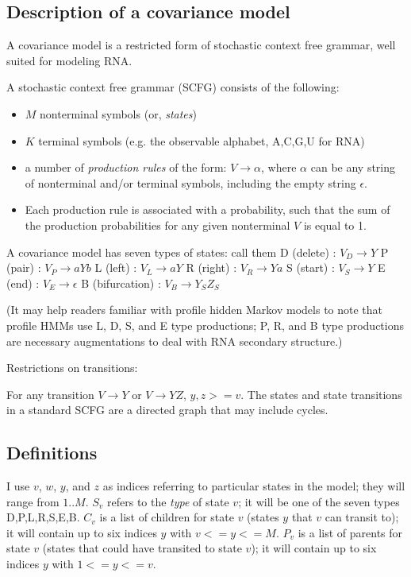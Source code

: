 \subsection{Description of a covariance model}

A covariance model is a restricted form of stochastic context free
grammar, well suited for modeling RNA.

A stochastic context free grammar (SCFG) consists of the following:

\begin{itemize}
\item $M$ nonterminal symbols (or, \emph{states})
\item $K$ terminal symbols (e.g. the observable alphabet, {A,C,G,U} for RNA)
\item a number of \emph{production rules} of the form:
      $V \rightarrow \alpha$,
      where $\alpha$ can be any string of nonterminal and/or terminal
      symbols, including the empty string
      $\epsilon$.
\item Each production rule is associated with a probability, such that
      the sum of the production probabilities for any given
      nonterminal $V$ is equal to 1.
\end{itemize} 

A covariance model has seven types of states: call them 
D (delete)          : $V_D \rightarrow Y$
P (pair)            : $V_P \rightarrow a Y b$
L (left)            : $V_L \rightarrow a Y$
R (right)           : $V_R \rightarrow Y a$
S (start)           : $V_S \rightarrow Y$
E (end)             : $V_E \rightarrow \epsilon$
B (bifurcation)     : $V_B \rightarrow Y_S Z_S$

(It may help readers familiar with profile hidden Markov models to
note that profile HMMs use L, D, S, and E type productions; P, R, and
B type productions are necessary augmentations to deal with RNA
secondary structure.)

Restrictions on transitions:

For any transition $V \rightarrow Y$ or $V \rightarrow YZ$, $y,z >=
v$. The states and state transitions in a standard SCFG are a directed
graph that may include cycles. 

\subsection{Definitions}

I use $v$, $w$, $y$, and $z$ as indices referring to particular states
in the model; they will range from $1..M$. $S_v$ refers to the
\emph{type} of state $v$; it will be one of the seven types
{D,P,L,R,S,E,B}. $C_v$ is a list of children for state $v$ (states $y$
that $v$ can transit to); it will contain up to six indices $y$ with
$v <= y <= M$. $P_v$ is a list of parents for state $v$ (states that
could have transited to state $v$); it will contain up to six indices
$y$ with $1 <= y <= v$.

